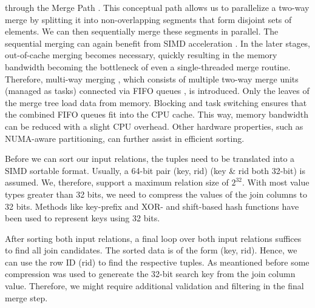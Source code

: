 through the Merge Path \cite{MergePath}. This conceptual path allows us to parallelize a two-way merge by splitting
it into non-overlapping segments that form disjoint sets of elements. We can then sequentially
merge these segments in parallel. The sequential merging can again benefit from SIMD acceleration \cite{Watkins}.
In the later stages, out-of-cache merging becomes necessary, quickly resulting in the memory
bandwidth becoming the bottleneck of even a single-threaded merge routine. Therefore, multi-way
merging \cite{Balkesen}, which consists of multiple two-way merge units (managed as tasks) connected via FIFO queues
, is introduced. Only the leaves of the merge tree load data from memory. Blocking and task switching 
ensures that the combined FIFO queues fit into the CPU cache. This way, memory bandwidth can be reduced
with a slight CPU overhead. Other hardware properties, such as NUMA-aware partitioning, can further
assist in efficient sorting.

Before we can sort our input relations, the tuples need to be translated into a SIMD sortable
format. Usually, a 64-bit pair (key, rid) (key \& rid both 32-bit) is assumed. We, therefore,
support a maximum relation size of $2^{32}$. With most value types greater
than 32 bits, we need to compress the values of the join columns to 32 bits. Methods like 
key-prefix \cite{chris_nyberg__1994} and XOR- and shift-based hash functions \cite{1319989} have 
been used to represent keys using 32 bits.

After sorting both input relations, a final loop over both input relations suffices to find all
join candidates. The sorted data is of the form (key, rid). Hence, we can use the row ID (rid) to
find the respective tuples. As meantioned before some compression was used to genereate the 32-bit
search key from the join column value. Therefore, we might require additional validation and 
filtering in the final merge step.

